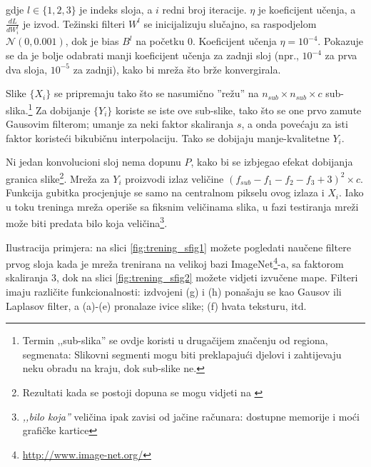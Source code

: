 \documentclass[12pt]{report}
\numberwithin{equation}{section}
\begin{document}
gdje $l \in \{ 1, 2, 3 \}$ je indeks sloja, a $i$ redni broj iteracije. $\eta$ je koeficijent učenja, a $\frac{dL}{dW_i^l}$ je izvod. Težinski filteri ${W^l}$ se inicijalizuju slučajno, sa raspodjelom $\mathcal{N}(0, 0.001)$, dok je bias ${B^l}$ na početku $0$. Koeficijent učenja $\eta = 10^{-4}$. Pokazuje se da je bolje odabrati manji koeficijent učenja za zadnji sloj (npr., $10^{-4}$ za prva dva sloja, $10^{-5}$ za zadnji), kako bi mreža što brže konvergirala. 

Slike $\{X_i\}$ se pripremaju tako što se nasumično ''režu'' na $n_{sub} \times n_{sub} \times c$ sub-slika.\footnote{Termin ,,sub-slika'' se ovdje koristi u drugačijem značenju od regiona, segmenata: Slikovni segmenti mogu biti preklapajući djelovi i zahtijevaju neku obradu na kraju, dok sub-slike ne.} Za dobijanje $\{Y_i\}$ koriste se iste ove sub-slike, tako što se one prvo zamute Gausovim filterom; umanje za neki faktor skaliranja $s$, a onda povećaju za isti faktor koristeći bikubičnu interpolaciju. Tako se dobijaju manje-kvalitetne ${Y_i}$. 

Ni jedan konvolucioni sloj nema dopunu $P$, kako bi se izbjegao efekat dobijanja granica slike\footnote{Rezultati kada se postoji dopuna se mogu vidjeti na \cite{samples}}. Mreža za $Y_i$ proizvodi izlaz veličine $(f_{sub} - f_1 - f_2 - f_3 + 3 )^2 \times c$. Funkcija gubitka procjenjuje se samo na centralnom pikselu ovog izlaza i $X_i$. Iako u toku treninga mreža operiše sa fiksnim veličinama slika, u fazi testiranja mreži može biti predata bilo koja veličina\footnote{\textit{,,bilo koja''} veličina ipak zavisi od jačine računara: dostupne memorije i moći grafičke kartice}.   

Ilustracija primjera: na slici \ref{fig:trening_sfig1} možete pogledati naučene filtere prvog sloja kada je mreža trenirana na velikoj bazi ImageNet\footnote{\url{http://www.image-net.org/}}-a, sa faktorom skaliranja 3, dok na slici  \ref{fig:trening_sfig2} možete vidjeti izvučene mape. Filteri imaju različite funkcionalnosti: izdvojeni (g) i (h) ponašaju se kao Gausov ili Laplasov filter, a (a)-(e) pronalaze ivice slike; (f) hvata teksturu, itd. 
\end{document}
